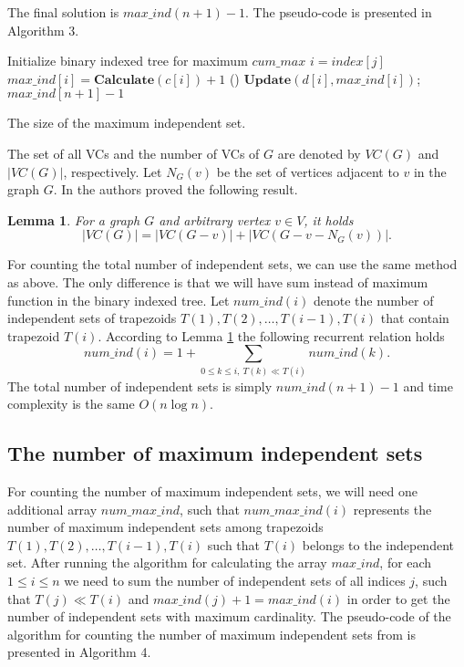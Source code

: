 \documentclass[11pt,letter]{article}
\newtheorem{lemma}[thm]{Lemma}
\begin{document}
The final solution is $max\_ind(n+1) - 1$. The pseudo-code is presented in Algorithm 3.

\begin{algorithm}

    Initialize binary indexed tree for maximum $cum\_max$\;
    {
        $i = index [j]$\;
        {
            $max\_ind [i] = \mathbf{Calculate} (c [i]) + 1$\;
        }
        \Else()
        {
            $\mathbf{Update} (d [i], max\_ind [i])$;
        }
    }
    \Return $max\_ind [n + 1] - 1$\;

    \caption{ The size of the maximum independent set. }
\end{algorithm}


\medskip

The set of all VCs and the number of VCs of $G$ are denoted by $VC(G)$ and $|VC(G)|$, respectively.
Let $N_G(v)$ be the set of vertices adjacent to $v$ in the graph $G$. In \cite{LiCh09} the authors
proved the following result.

\begin{lemma}
\label{le-1} For a graph $G$ and arbitrary vertex $v \in V$, it holds
$$
|VC (G)| = |VC (G - v)| + |VC (G - v - N_G (v))|.
$$
\end{lemma}


For counting the total number of independent sets, we can use the same method as above. The only
difference is that we will have sum instead of maximum function in the binary indexed tree. Let
$num\_ind (i)$ denote the number of independent sets of trapezoids $T(1), T(2), \ldots, T(i-1), T
(i)$ that contain trapezoid $T(i)$. According to Lemma \ref{le-1} the following recurrent relation
holds
$$
num\_ind (i) = 1 + \sum_{0 \leq k \leq i, \ T (k) \ll T (i)} num\_ind (k).
$$
The total number of independent sets is simply $num\_ind (n + 1) - 1$ and time complexity is the
same $O (n \log n)$.


\subsection{The number of maximum independent sets}



For counting the number of maximum independent sets, we will need one additional array
$num\_max\_ind$, such that $num\_max\_ind (i)$ represents the number of maximum independent sets
among trapezoids $T (1), T (2), \ldots, T (i- 1), T (i)$ such that $T (i)$ belongs to the
independent set. After running the algorithm for calculating the array $max\_ind$, for each $1 \leq
i \leq n$ we need to sum the number of independent sets of all indices $j$, such that $T (j) \ll T
(i)$ and $max\_ind (j) + 1 = max\_ind (i)$ in order to get the number of independent sets with
maximum cardinality. The pseudo-code of the algorithm for counting the number of maximum
independent sets from \cite{LiCh09} is presented in Algorithm 4.
\end{document}
